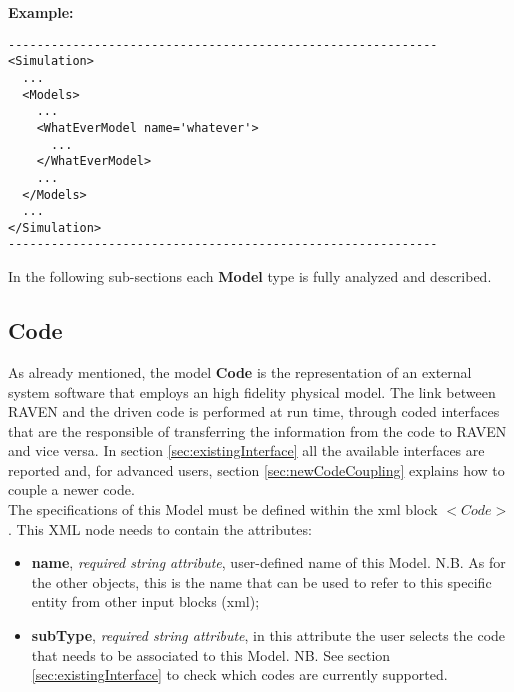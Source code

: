 \textbf{Example:}
\begin{lstlisting}[style=XML]
------------------------------------------------------------
<Simulation>
  ...
  <Models>
    ...
    <WhatEverModel name='whatever'>
      ... 
    </WhatEverModel>
    ...
  </Models>
  ...
</Simulation>
------------------------------------------------------------
\end{lstlisting}
In the following sub-sections each \textbf{Model} type is fully analyzed and described.
\subsection{Code}
\label{subsec:models_code}
As already mentioned, the model \textbf{Code} is the representation of an external system software that employs an high fidelity physical model. The link between RAVEN and the driven code is performed at run time, through coded interfaces that are the responsible of transferring the information from the code to RAVEN and vice versa. In section \ref{sec:existingInterface} all the available interfaces are reported and, for advanced users, section \ref{sec:newCodeCoupling} explains how to couple a newer code.
\\ The specifications of this Model must be defined within the xml block $<Code>$. This XML node needs to contain the attributes:
\vspace{-5mm}
\begin{itemize}
\itemsep0em
\item \textbf{name}, \textit{required string attribute}, user-defined name of this Model. N.B. As for the other objects, this is the name that can be used to refer to this specific entity from other input blocks (xml);
\item \textbf{subType}, \textit{required string attribute}, in this attribute the user selects the code that needs to be associated to this Model. NB. See section \ref{sec:existingInterface} to check which codes are currently supported.
\end{itemize}
\vspace{-5mm}

